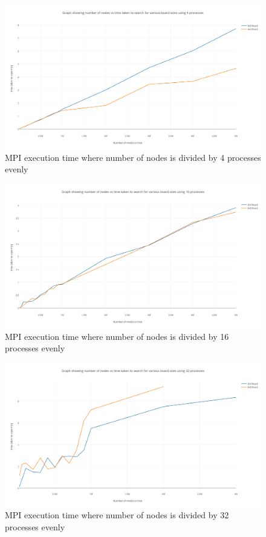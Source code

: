 \documentclass[a4paper]{report}
\begin{document}
\begin{figure}[H]
	\centering
	\includegraphics[width=1.3\textwidth]{images/mpi_4procs}
	\caption{MPI execution time where number of nodes is divided by 4 processes evenly}
\end{figure}

\begin{figure}[H]
	\centering
	\includegraphics[width=1.3\textwidth]{images/mpi_16procs}
	\caption{MPI execution time where number of nodes is divided by 16 processes evenly}
\end{figure}

\begin{figure}[H]
	\centering
	\includegraphics[width=1.3\textwidth]{images/mpi_32procs}
	\caption{MPI execution time where number of nodes is divided by 32 processes evenly}
\end{figure}
\end{document}
